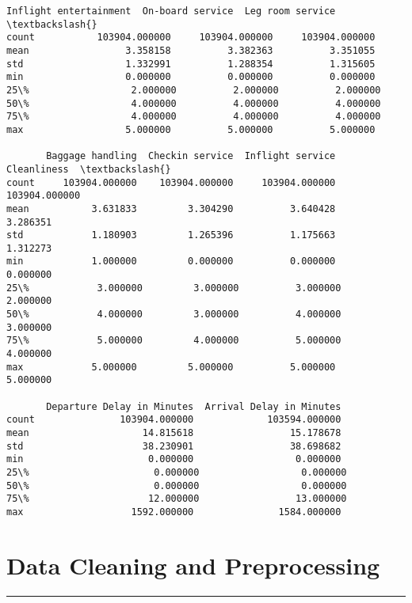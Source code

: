 \documentclass[11pt]{article}
\begin{document}
\begin{tcolorbox}[breakable, size=fbox, boxrule=.5pt, pad at break*=1mm, opacityfill=0]
\begin{Verbatim}[commandchars=\\\{\}]
       Inflight entertainment  On-board service  Leg room service  \textbackslash{}
count           103904.000000     103904.000000     103904.000000
mean                 3.358158          3.382363          3.351055
std                  1.332991          1.288354          1.315605
min                  0.000000          0.000000          0.000000
25\%                  2.000000          2.000000          2.000000
50\%                  4.000000          4.000000          4.000000
75\%                  4.000000          4.000000          4.000000
max                  5.000000          5.000000          5.000000

       Baggage handling  Checkin service  Inflight service    Cleanliness  \textbackslash{}
count     103904.000000    103904.000000     103904.000000  103904.000000
mean           3.631833         3.304290          3.640428       3.286351
std            1.180903         1.265396          1.175663       1.312273
min            1.000000         0.000000          0.000000       0.000000
25\%            3.000000         3.000000          3.000000       2.000000
50\%            4.000000         3.000000          4.000000       3.000000
75\%            5.000000         4.000000          5.000000       4.000000
max            5.000000         5.000000          5.000000       5.000000

       Departure Delay in Minutes  Arrival Delay in Minutes
count               103904.000000             103594.000000
mean                    14.815618                 15.178678
std                     38.230901                 38.698682
min                      0.000000                  0.000000
25\%                      0.000000                  0.000000
50\%                      0.000000                  0.000000
75\%                     12.000000                 13.000000
max                   1592.000000               1584.000000
\end{Verbatim}
\end{tcolorbox}
        
    \section{Data Cleaning and
Preprocessing}\label{data-cleaning-and-preprocessing}

\begin{center}\rule{0.5\linewidth}{0.5pt}\end{center}
\end{document}
